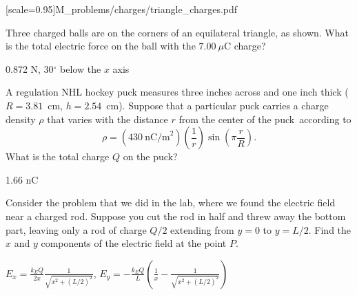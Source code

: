 [scale=0.95]{M_problems/charges/triangle_charges.pdf}{
\begin{Exercise}
Three charged balls are on the corners of an equilateral triangle, as shown. 
What is the total electric force on the ball with the $7.00~\mu$C charge?
\end{Exercise}
\begin{Answer}
 0.872 N, 30$^\circ$ below the $x$ axis
\end{Answer}

\begin{Exercise}
A regulation NHL hockey puck measures three inches across and one inch thick 
($R=3.81$~cm, $h=2.54$~cm).  Suppose that a particular puck carries a charge density $\rho$
that varies with the distance $r$ from the center of the puck\footnotemark ~according to
$$
\rho = (430~\text{nC/m}^2)\left(\frac{1}{r} \right) \sin \left( \pi \frac{r}{R} \right).
$$
What is the total charge $Q$ on the puck?

\end{Exercise}
}%
\begin{Answer}
1.66 nC
\end{Answer}


\begin{Exercise}
Consider the problem that we did in the lab, where we found the electric field near a charged rod.  
Suppose you cut the rod in half and threw away the bottom part, leaving only a rod of charge $Q/2$ extending from $y=0$ to $y=L/2$.  
Find the $x$ and $y$ components of the electric field at the point $P$. 
\vspace*{0.2in}
\pagebreak
\end{Exercise}
\begin{Answer}
$\displaystyle E_x =   \frac {k_EQ}{2x} \frac{1}{\sqrt{x^2 + (L/2)^2}}$, 
$\displaystyle E_y = - \frac {k_EQ}{L} \left( \frac{1}{x} - \frac{1}{\sqrt{x^2 + (L/2)^2}} \right)$
\end{Answer}

